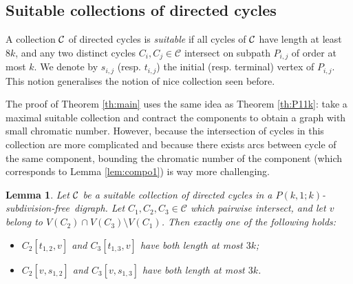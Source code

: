 \documentclass[utf8,10pt]{article}
\theoremstyle{plain}
\newtheorem{lemma}[theorem]{Lemma}
\theoremstyle{definition}
\theoremstyle{remark}
\newcommand{\free}{subdivision-free}
\begin{document}
\subsection{Suitable collections of directed cycles}
 
 A collection ${\cal C}$ of directed cycles is {\it suitable} if all cycles of ${\cal C}$ have length at least $8k$, and
any two distinct cycles $C_i,C_j\in\mathcal C$ intersect on  subpath $P_{i,j}$ of order at most $k$.
We denote by $s_{i,j}$ (resp. $t_{i,j}$) the initial (resp. terminal) vertex of  $P_{i,j}$. This notion generalises 
the notion of nice collection seen before. 

The proof of Theorem \ref{th:main} uses the same idea as Theorem \ref{th:P11k}: take a maximal suitable collection and contract 
the components to obtain a graph with small chromatic number. However, because the intersection of cycles in this collection are more
complicated and because there exists arcs between cycle of the same component, bounding the chromatic number of the component (which corresponds to Lemma \ref{lem:compo1}) is way more challenging.

 
 
 
 \begin{lemma}\label{lem:dis}
 Let ${\cal C}$ be a suitable collection of directed cycles in a $P(k,1;k)$-\free\ digraph.
Let $C_1,C_2,C_3\in\mathcal C$ which pairwise intersect, and let $v$ belong to $V(C_2)\cap V(C_3)\setminus V(C_1)$. 
Then exactly one of the following holds:
\begin{itemize}
\item $C_2[t_{1,2}, v]$ and $C_3[t_{1,3}, v]$ have both length at most $3k$; 
\item $C_2[v, s_{1,2}]$ and $C_3[v, s_{1,3}]$ have both length at most $3k$.
\end{itemize}
\end{lemma}
\end{document}
